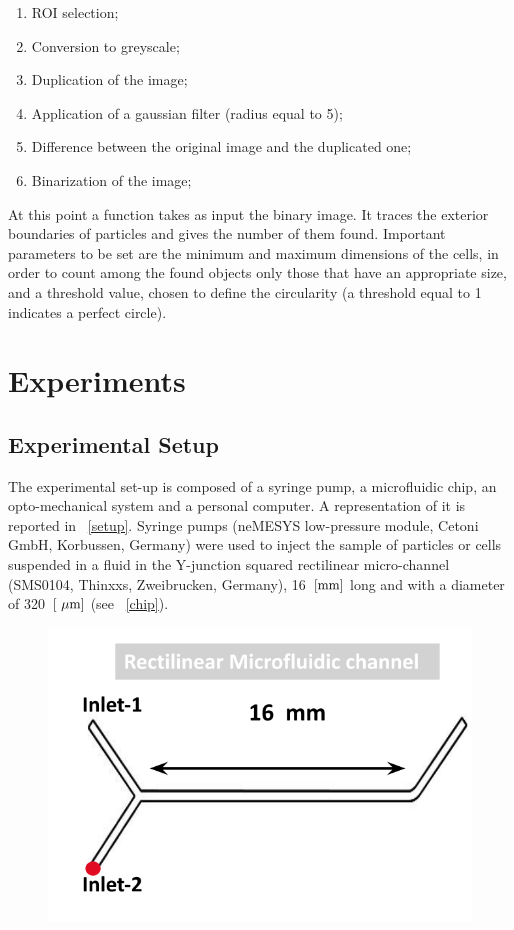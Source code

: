 \documentclass[journal]{IEEEtran}
\theoremstyle{definition}
\theoremstyle{remark}
\begin{document}
 \begin{enumerate}
 	\item ROI selection;
 	\item Conversion to greyscale;
 	\item Duplication of the image;
 	\item Application of a gaussian filter (radius equal to 5);
 	\item Difference between the original image and the duplicated one;
 	\item Binarization of the image;
 \end{enumerate}
At this point a function takes as input the binary image. It traces the exterior boundaries of particles and gives the number of them found.
Important parameters to be set are the minimum and maximum dimensions of the cells, in order to count among the found objects only those that have an appropriate size, and a threshold value, chosen to define the circularity (a threshold equal to 1 indicates a perfect circle).


\section{Experiments}

\subsection{Experimental Setup}

The experimental set-up is composed of a syringe pump, a microfluidic chip, an opto-mechanical system and a personal computer. A representation of it is reported in ~\fig\ref{setup}. Syringe pumps (neMESYS low-pressure module, Cetoni GmbH,
Korbussen, Germany) were used to inject the sample of particles or cells suspended in a fluid in the Y-junction squared rectilinear micro-channel (SMS0104, Thinxxs, Zweibrucken, Germany), 16~$[\rm mm]$ long and with a diameter of 320~$[\rm~\mu m]$ (see ~\fig\ref{chip}).

\begin{figure}[t]
	\centering
	\includegraphics[width=0.5\columnwidth]{images/chip}
\end{figure}
\end{document}
